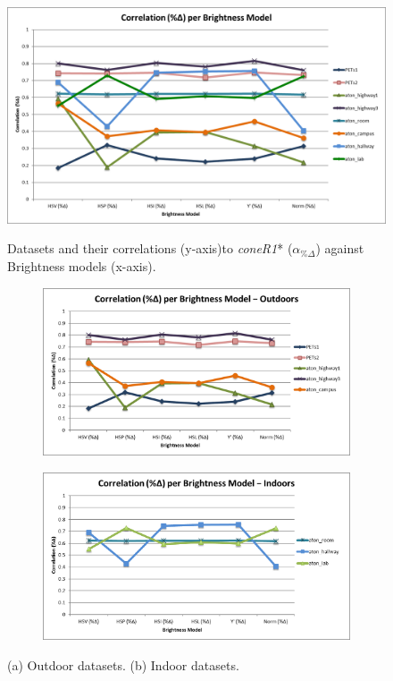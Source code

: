 \begin{figure}
  \caption{Datasets and their correlations (y-axis)to \textit{coneR1}* ($\alpha_{\%\Delta}$) against Brightness models (x-axis).}
  \includegraphics[width=\linewidth]{figures/correlation_x_rgb.jpg}
\label{fig:brightness_corr_rgb}
\end{figure}

\begin{figure}
\centering
\begin{subfigure}{.8\linewidth}
  \includegraphics[width=1\linewidth]{figures/correlation_outdoors_rgb.jpg}
  \caption{}
\end{subfigure}
\hfill
\begin{subfigure}{.8\linewidth}
  \includegraphics[width=1\linewidth]{figures/correlation_indoors_rgb.jpg}
  \caption{}
\end{subfigure}

\caption{(a) Outdoor datasets. (b) Indoor datasets.}
\label{fig:brightness_indoor_outdoor_rgb}
\end{figure}

